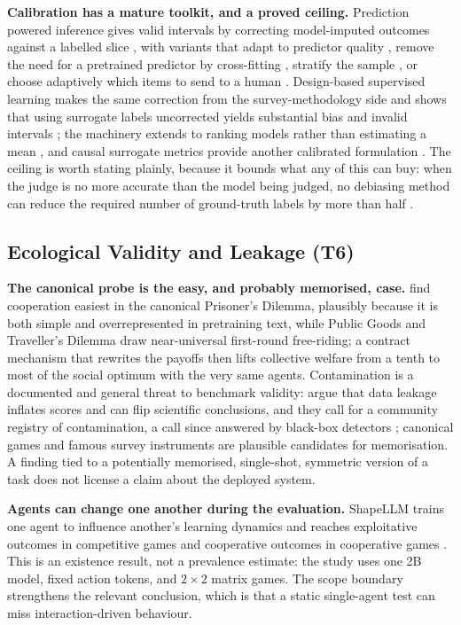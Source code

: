 \documentclass[11pt]{article}
\begin{document}
\textbf{Calibration has a mature toolkit, and a proved ceiling.} Prediction
powered inference gives valid intervals by correcting model-imputed outcomes
against a labelled slice \cite{angelopoulos2023ppi}, with variants that adapt
to predictor quality \cite{angelopoulos2023ppiplus}, remove the need for a
pretrained predictor by cross-fitting \cite{zrnic2024crossppi}, stratify the
sample \cite{fisch2024stratified}, or choose adaptively which items to send to
a human \cite{zrnic2024active,gligoric2025confident}. Design-based supervised
learning makes the same correction from the survey-methodology side and shows
that using surrogate labels uncorrected yields substantial bias and invalid
intervals \cite{egami2023dsl}; the machinery extends to ranking models rather
than estimating a mean \cite{chatzi2024ranking}, and causal surrogate metrics
provide another calibrated formulation \cite{landesberg2025causaljudge}. The ceiling is worth stating
plainly, because it bounds what any of this can buy: when the judge is no more
accurate than the model being judged, no debiasing method can reduce the
required number of ground-truth labels by more than half \cite{dorner2025limits}.

\subsection{Ecological Validity and Leakage (T6)}
\label{app:t6evidence}

\textbf{The canonical probe is the easy, and probably memorised, case.}
\citet{tewolde2026coopeval} find cooperation easiest in the canonical Prisoner's
Dilemma, plausibly because it is both simple and overrepresented in pretraining
text, while Public Goods and Traveller's Dilemma draw near-universal first-round
free-riding; a contract mechanism that rewrites the payoffs then lifts collective
welfare from a tenth to most of the social optimum with the very same agents.
Contamination
is a documented and general threat to benchmark validity:
\citet{sainz2023nlp} argue that data leakage inflates scores and can flip
scientific conclusions, and they call for a community registry of
contamination, a call since answered by black-box detectors
\cite{oren2024proving,dekoninck2024constat,zhang2024pacost}; canonical games and
famous survey instruments are plausible candidates for memorisation. A finding
tied to a potentially memorised, single-shot, symmetric version of a task does
not license a claim
about the deployed system.

\textbf{Agents can change one another during the evaluation.}
ShapeLLM trains one agent to influence another's learning dynamics and reaches
exploitative outcomes in competitive games and cooperative outcomes in
cooperative games \cite{segura2025opponentshaping}. This is an existence result,
not a prevalence estimate: the study uses one 2B model, fixed action tokens, and
$2\times2$ matrix games. The scope boundary strengthens the relevant conclusion,
which is that a static single-agent test can miss interaction-driven behaviour.
\end{document}
